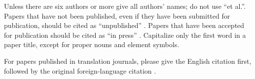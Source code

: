 \documentclass[conference]{IEEEtran}
\begin{document}
Unless there are six authors or more give all authors' names; do not use 
``et al.''. Papers that have not been published, even if they have been 
submitted for publication, should be cited as ``unpublished'' . Papers 
that have been accepted for publication should be cited as ``in press'' . 
Capitalize only the first word in a paper title, except for proper nouns and 
element symbols.

For papers published in translation journals, please give the English 
citation first, followed by the original foreign-language citation .



\end{document}
